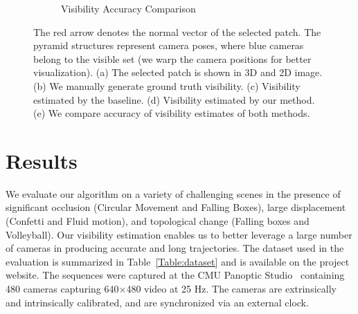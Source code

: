 \begin{figure}[t]
\begin{subfigure}{0.4\textwidth}
		\caption{Visibility Accuracy Comparison}
	\end{subfigure}
	\caption{The red arrow denotes the normal vector of the selected patch. The pyramid structures represent camera poses, where blue cameras belong to the visible set (we warp the camera positions for better visualization). (a) The selected patch is shown in 3D and 2D image. (b) We manually generate ground truth visibility. (c) Visibility estimated by the baseline. (d) Visibility estimated by our method. (e) We compare accuracy of visibility estimates of both methods.} 
	\label{Fig:visibilityError}
\end{figure}


\section{Results}






We evaluate our algorithm on a variety of challenging scenes in the presence of significant occlusion (Circular Movement and Falling Boxes), large displacement (Confetti and Fluid motion), and topological change (Falling boxes and Volleyball). Our visibility estimation enables us to better leverage a large number of cameras in producing accurate and long trajectories. The dataset used in the evaluation is summarized in Table~\ref{Table:dataset} and is available on the project website. The sequences were captured at the CMU Panoptic Studio~\cite{joo2017panoptic} containing 480 cameras capturing 640$\times$480 video at 25 Hz. The cameras are extrinsically and intrinsically calibrated, and are synchronized via an external clock.


